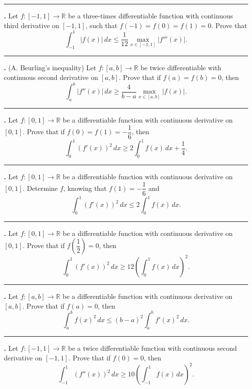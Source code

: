 \documentclass[11pt]{article}
\newcounter{probnum}
\newenvironment{problembox}{\par\noindent\rule{\linewidth}{0.5pt}\vspace{5pt}\par}{\vspace{2pt}}
\begin{document}
\begin{problembox}
\textbf{\theprobnum.} Let $f : [-1,1] \to \mathbb{R}$ be a three-times differentiable function with continuous third derivative on $[-1,1]$, such that $f(-1)=f(0)=f(1)=0$. Prove that
\[
\int_{-1}^{1} |f(x)|\,dx \le \frac{1}{12} \max_{x \in [-1,1]} |f'''(x)|.
\]
\end{problembox}

\begin{problembox}
\textbf{\theprobnum.} (A. Beurling's inequality) Let $f : [a,b] \to \mathbb{R}$ be twice differentiable with continuous second derivative on $[a,b]$. Prove that if $f(a)=f(b)=0$, then
\[
\int_a^b |f''(x)|\,dx \ge \frac{4}{b-a} \max_{x \in [a,b]} |f(x)|.
\]
\end{problembox}

\begin{problembox}
\textbf{\theprobnum.} Let $f : [0,1] \to \mathbb{R}$ be a differentiable function with continuous derivative on $[0,1]$. Prove that if $f(0)=f(1)=-\dfrac{1}{6}$, then
\[
\int_0^1 (f'(x))^2\,dx \ge 2 \int_0^1 f(x)\,dx + \frac{1}{4}.
\]
\end{problembox}

\begin{problembox}
\textbf{\theprobnum.} Let $f : [0,1] \to \mathbb{R}$ be a differentiable function with continuous derivative on $[0,1]$. Determine $f$, knowing that $f(1) = -\dfrac{1}{6}$ and
\[
\int_0^1 (f'(x))^2\,dx \le 2 \int_0^1 f(x)\,dx.
\]
\end{problembox}

\begin{problembox}
\textbf{\theprobnum.} Let $f : [0,1] \to \mathbb{R}$ be a differentiable function with continuous derivative on $[0,1]$. Prove that if $f\left(\dfrac{1}{2}\right) = 0$, then
\[
\int_0^1 (f'(x))^2\,dx \ge 12 \left(\int_0^1 f(x)\,dx\right)^2.
\]
\end{problembox}

\begin{problembox}
\textbf{\theprobnum.} Let $f : [a,b] \to \mathbb{R}$ be a differentiable function with continuous derivative on $[a,b]$. Prove that if $f(a)=0$, then
\[
\int_a^b f(x)^2\,dx \le (b-a)^2 \int_a^b f'(x)^2\,dx.
\]
\end{problembox}

\begin{problembox}
\textbf{\theprobnum.} Let $f : [-1,1] \to \mathbb{R}$ be a twice differentiable function with continuous second derivative on $[-1,1]$. Prove that if $f(0)=0$, then
\[
\int_{-1}^{1} (f''(x))^2\,dx \ge 10 \left(\int_{-1}^{1} f(x)\,dx\right)^2.
\]
\end{problembox}
\end{document}
